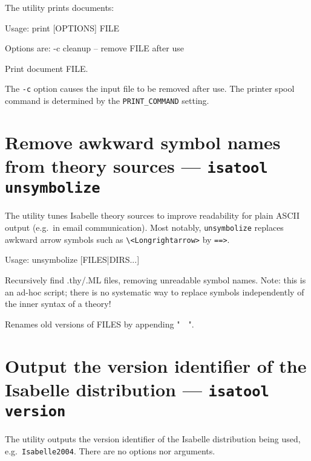 The  utility prints documents:
\begin{ttbox}
Usage: print [OPTIONS] FILE

  Options are:
    -c           cleanup -- remove FILE after use

  Print document FILE.
\end{ttbox}

The \texttt{-c} option causes the input file to be removed after use.  The
printer spool command is determined by the \texttt{PRINT_COMMAND} setting.


\section{Remove awkward symbol names from theory sources --- \texttt{isatool unsymbolize}}

The  utility tunes Isabelle theory sources to improve
readability for plain ASCII output (e.g.\ in email communication).  Most
notably, \texttt{unsymbolize} replaces awkward arrow symbols such as
\verb|\<Longrightarrow>| by \verb|==>|.
\begin{ttbox}
Usage: unsymbolize [FILES|DIRS...]

  Recursively find .thy/.ML files, removing unreadable symbol names.
  Note: this is an ad-hoc script; there is no systematic way to replace
  symbols independently of the inner syntax of a theory!

  Renames old versions of FILES by appending "~~".
\end{ttbox}


\section{Output the version identifier of the Isabelle distribution --- \texttt{isatool version}}

The  utility outputs the version identifier of the Isabelle
distribution being used, e.g.\ \texttt{Isabelle2004}.  There are no options
nor arguments.

